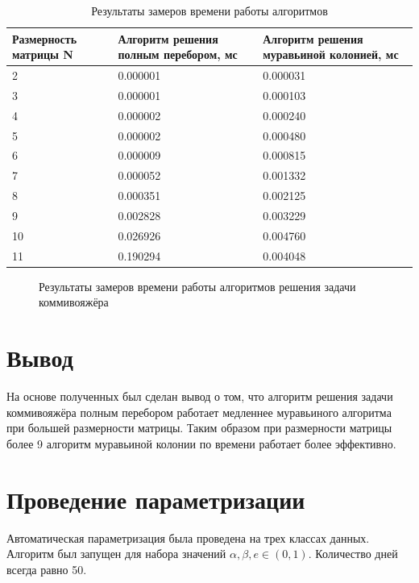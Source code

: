 \begin{longtable}{|p{}|p{}|p{}|}
	\caption{Результаты замеров времени работы алгоритмов}\label{tbl:time}  \\\hline
	Размерность матрицы N & Алгоритм решения полным перебором, мс & Алгоритм решения муравьиной колонией, мс   \\\hline
	\endfirsthead
	2 & 0.000001 & 0.000031 \\
	\hline
	3 & 0.000001 & 0.000103 \\
	\hline
	4 & 0.000002 & 0.000240 \\
	\hline
	5 & 0.000002 & 0.000480 \\
	\hline
	6 & 0.000009 & 0.000815 \\
	\hline
	7 & 0.000052 & 0.001332 \\
	\hline
	8 & 0.000351 & 0.002125 \\
	\hline
	9 & 0.002828 & 0.003229 \\
	\hline
	10 & 0.026926 & 0.004760 \\
	\hline
	11 & 0.190294 & 0.004048 \\
	\hline
\end{longtable}

\begin{figure}[H]
	\centering
	
	\caption{Результаты замеров времени работы алгоритмов решения задачи коммивояжёра}
	\label{plt:time}
\end{figure}

\section*{Вывод}
На основе полученных был сделан вывод о том, что алгоритм решения задачи коммивояжёра полным перебором работает медленнее муравьиного алгоритма при большей размерности матрицы. Таким образом при размерности матрицы более 9 алгоритм муравьиной колонии по времени работает более эффективно.

\section{Проведение параметризации}

Автоматическая параметризация была проведена на трех классах данных.
Алгоритм был запущен для набора значений $\alpha, \beta, e  \in (0, 1)$. Количество дней всегда равно 50.

